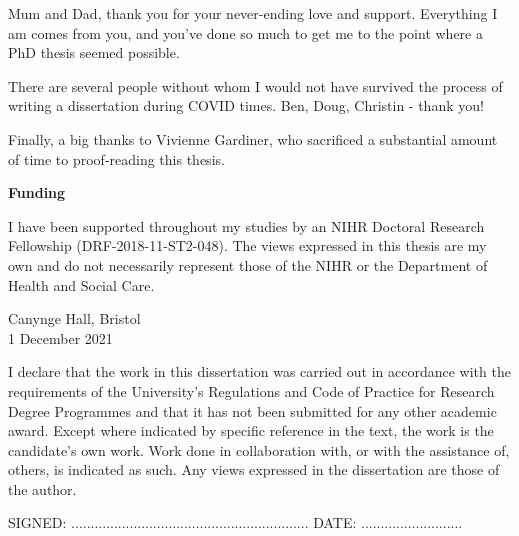 \documentclass[a4paper, twoside]{templates/ociamthesis}
\begin{document}
\begin{romanpages}
\begin{acknowledgements}
  Mum and Dad, thank you for your never-ending love and support. Everything I am comes from you, and you've done so much to get me to the point where a PhD thesis seemed possible.

  There are several people without whom I would not have survived the process of writing a dissertation during COVID times. Ben, Doug, Christin - thank you!

  Finally, a big thanks to Vivienne Gardiner, who sacrificed a substantial amount of time to proof-reading this thesis.

  \bigskip

  \textbf{Funding}

  I have been supported throughout my studies by an NIHR Doctoral Research Fellowship (DRF-2018-11-ST2-048). The views expressed in this thesis are my own and do not necessarily represent those of the NIHR or the Department of Health and Social Care.

  \bigskip

  \begin{flushright}
  Canynge Hall, Bristol \\1 December 2021
  \end{flushright}
\end{acknowledgements}

\begin{declaration}
 	I declare that the work in this dissertation was carried out in accordance with the requirements of the University's Regulations and Code of Practice for Research Degree Programmes and that it has not been submitted for any other academic award. Except where indicated by specific reference in the text, the work is the candidate's own work. Work done in collaboration with, or with the assistance of, others, is indicated as such. Any views expressed in the dissertation are those of the author.

  \bigskip
  \bigskip

  \begin{flushright}
  SIGNED: .............................................................         DATE: ..........................\\
  \end{flushright}
\end{declaration}

% 
  \dominitoc %


\end{romanpages}
\end{document}

